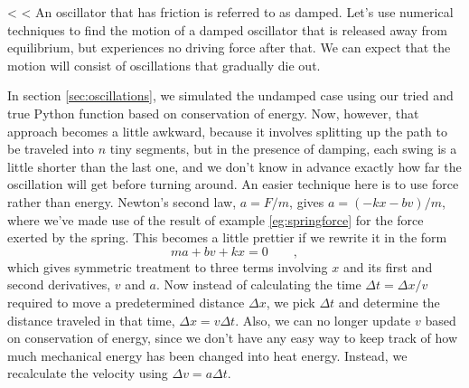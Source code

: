 <%
        <%
        An oscillator that has friction is referred to as
        damped.
        Let's use numerical techniques to find the motion of a damped
        oscillator that is released away from equilibrium, but experiences
        no driving force after that. We can expect that the motion will consist
        of oscillations that gradually die out.

        In section \ref{sec:oscillations}, we simulated the undamped case using
        our tried and true Python function based on conservation of energy. Now,
        however, that approach becomes a little awkward, because it involves
        splitting up the path to be traveled into $n$ tiny segments, but in the presence of damping,
        each swing is a little shorter than the last one, and
        we don't know in advance exactly how far the oscillation will get before turning around.
        An easier technique here is to use force rather than energy.
        Newton's second law, $a=F/m$, gives $a=(-kx-bv)/m$, where we've made use
        of the result of example \ref{eg:springforce} for the force exerted by the spring.
        This becomes a little prettier if we rewrite it in the form
        \begin{equation*}
                ma+bv+kx = 0 \qquad ,
        \end{equation*}
        which gives symmetric treatment to three terms involving $x$ and its first and
        second derivatives, $v$ and $a$. Now instead of calculating the time $\Delta{}t=\Delta{}x/v$
        required to move a predetermined distance $\Delta{}x$, we pick $\Delta{}t$ and
        determine the distance traveled in that time, $\Delta{}x=v\Delta{}t$. Also, we can
        no longer update $v$ based on conservation of energy, since we don't have any
        easy way to keep track of how much mechanical energy has been changed into
        heat energy. Instead, we recalculate the velocity using $\Delta{}v=a\Delta{}t$.
